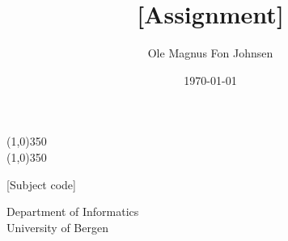 \documentclass[12pt]{report}
\title{[Assignment]}
\author{Ole Magnus Fon Johnsen}
\date{\today}
\begin{document}
    \begin{titlepage}
        \centering

        \line(1,0){350} \\
        \Huge{\textbf{\thetitle}}
        \line(1,0){350}

        \vspace{0.5cm}
        [Subject code]

        \vspace{1.5cm}

        \Large{\textbf{\theauthor}}

        \vfill
        \vspace{0.8cm}


        Department of Informatics\\
        University of Bergen\\
        \thedate
    \end{titlepage}

    \tableofcontents

    
    

    \nocite{*}
    
\end{document}
